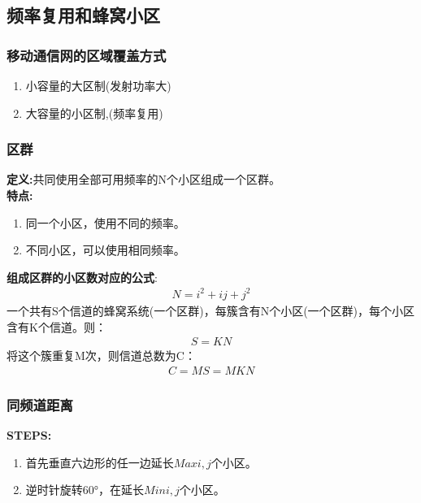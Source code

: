 \documentclass[a4paper ]{report}
\begin{document}
	\subsection{频率复用和蜂窝小区}
	\subsubsection{移动通信网的区域覆盖方式}
	\begin{enumerate}
		\item 小容量的大区制(发射功率大)
		\item  大容量的小区制,(频率复用)
	\end{enumerate}
	\subsubsection{区群}
	 \textbf{定义:}共同使用全部可用频率的N个小区组成一个区群。\\
	 \textbf{特点:}
	 \begin{enumerate}
	 	\item 同一个小区，使用不同的频率。
	 	\item 不同小区，可以使用相同频率。
	 \end{enumerate}
 	\textbf{组成区群的小区数对应的公式}:
 	\begin{eqnarray}
 		N = i^2+ij+j^2
 	\end{eqnarray}
	一个共有S个信道的蜂窝系统(一个区群)，每簇含有N个小区(一个区群)，每个小区含有K个信道。则：
	\begin{eqnarray}
		S = KN
	\end{eqnarray}
	将这个簇重复M次，则信道总数为C：
	\begin{eqnarray}
	C = MS = MKN
	\end{eqnarray}
	\subsubsection{同频道距离}
	\textbf{STEPS:}
	\begin{enumerate}
		\item 首先垂直六边形的任一边延长$Max{i,j}$个小区。
		\item 逆时针旋转60°，在延长$Min{i,j}$个小区。
	\end{enumerate}
\end{document}
